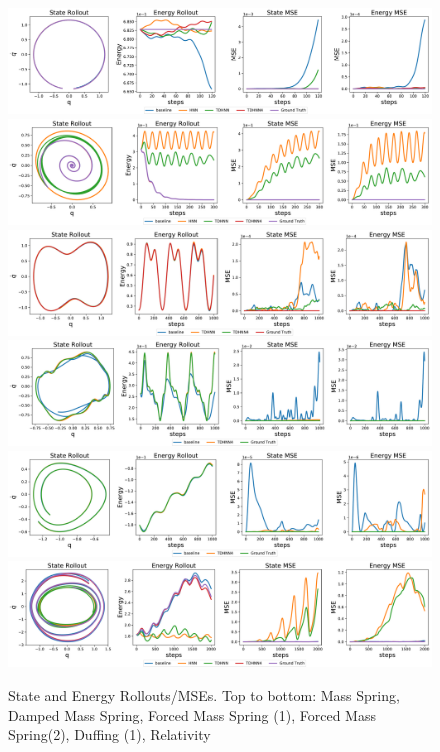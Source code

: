 \documentclass[twoside]{article}
\begin{document}
\begin{figure}[h!]
\centering
\includegraphics[width=.9\textwidth]{figures/mass_spring_long.pdf}
\includegraphics[width=.9\textwidth]{figures/damped_1_pred.pdf}
\includegraphics[width=.9\textwidth]{figures/mass_spring_forced_1_pred.pdf}
\includegraphics[width=.9\textwidth]{figures/mass_spring_forced_2_pred.pdf}
\includegraphics[width=.9\textwidth]{figures/duffing_1_pred.pdf}
\includegraphics[width=.9\textwidth]{figures/relativity_1_pred.pdf}
\caption{State and Energy Rollouts/MSEs. Top to bottom: Mass Spring, Damped Mass Spring, Forced Mass Spring (1), Forced Mass Spring(2), Duffing (1), Relativity}
\label{large_fig_rollout}
\end{figure}



\pagebreak


\end{document}

